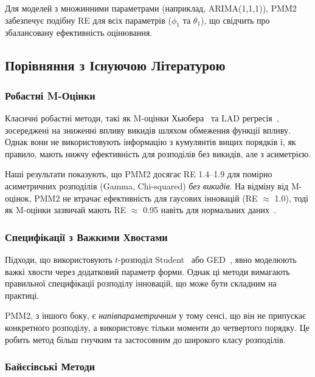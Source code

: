 \documentclass[12pt,a4paper]{article}
\begin{document}
	Для моделей з множинними параметрами (наприклад, ARIMA(1,1,1)), PMM2 забезпечує подібну RE для всіх параметрів ($\phi_1$ та $\theta_1$), що свідчить про збалансовану ефективність оцінювання.
	
	\subsection{Порівняння з Існуючою Літературою}
	\label{subsec:literature_comparison}
	
	\subsubsection{Робастні M-Оцінки}
	
	Класичні робастні методи, такі як M-оцінки Хьюбера~\cite{huber1964robust} та LAD регресія~\cite{koenker1978regression}, зосереджені на зниженні впливу викидів шляхом обмеження функції впливу. Однак вони не використовують інформацію з кумулянтів вищих порядків і, як правило, мають нижчу ефективність для розподілів без викидів, але з асиметрією.
	
	Наші результати показують, що PMM2 досягає RE 1.4--1.9 для помірно асиметричних розподілів (Gamma, Chi-squared) \textit{без викидів}. На відміну від M-оцінок, PMM2 не втрачає ефективність для гаусових інновацій (RE $\approx$ 1.0), тоді як M-оцінки зазвичай мають RE $\approx$ 0.95 навіть для нормальних даних~\cite{hampel1986robust}.
	
	\subsubsection{Специфікації з Важкими Хвостами}
	
	Підходи, що використовують $t$-розподіл Student~\cite{harvey2013dynamic} або GED~\cite{box2015time}, явно моделюють важкі хвости через додатковий параметр форми. Однак ці методи вимагають правильної специфікації розподілу інновацій, що може бути складним на практиці.
	
	PMM2, з іншого боку, є \textit{напівпараметричним} у тому сенсі, що він не припускає конкретного розподілу, а використовує тільки моменти до четвертого порядку. Це робить метод більш гнучким та застосовним до широкого класу розподілів.
	
	\subsubsection{Байєсівські Методи}
	
\end{document}
